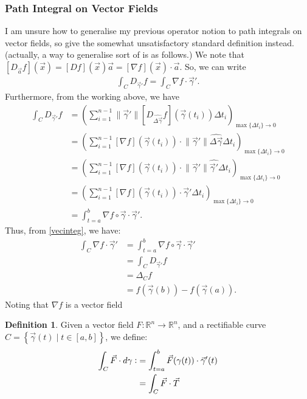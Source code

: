 \documentclass{article}
\theoremstyle{definition}
\newtheorem{defn}{Definition}[subsubsection]
\begin{document}
\subsubsection{Path Integral on Vector Fields}
I am unsure how to generalise my previous operator notion to path integrals on vector fields, so give the somewhat unsatisfactory standard definition instead.
(actually, a way to generalise sort of is as follows.)
We note that $[D_{\vec a}f](\vec x)=[Df](\vec x)\vec a=[\nabla f](\vec x)\cdot\vec a$. So, we can write
\begin{align}
	\int_CD_{\vec\gamma'}f=\int_C\nabla f\cdot\vec\gamma'.\label{vecinteg}
\end{align}
Furthermore, from the working above, we have
\begin{align*}
	\int_CD_{\vec\gamma'}f&=\left(\sum_{i=1}^{n-1}\lVert \vec\gamma'\rVert\left[D_{\hat{\Delta\vec\gamma}}f\right]\left(\vec\gamma (t_i)\right)\Delta t_i\right)_{\max\{\Delta t_i\}\rightarrow0}\\
	&=\left(\sum_{i=1}^{n-1}\left[\nabla f\right]\left(\vec\gamma (t_i)\right)\cdot\lVert \vec\gamma'\rVert\hat{\Delta\vec\gamma}\Delta t_i\right)_{\max\{\Delta t_i\}\rightarrow0}\\
	&=\left(\sum_{i=1}^{n-1}\left[\nabla f\right]\left(\vec\gamma (t_i)\right)\cdot\lVert \vec\gamma'\rVert\hat{\vec\gamma'}\Delta t_i\right)_{\max\{\Delta t_i\}\rightarrow0}\\
	&=\left(\sum_{i=1}^{n-1}\left[\nabla f\right]\left(\vec\gamma (t_i)\right)\cdot\vec\gamma'\Delta t_i\right)_{\max\{\Delta t_i\}\rightarrow0}\\
	&=\int_{t=a}^b\nabla f\circ\vec\gamma \cdot\vec\gamma'.
\end{align*}
Thus, from \eqref{vecinteg}, we have:
\begin{align*}
	\int_C\nabla f\cdot\vec\gamma'&=\int_{t=a}^b\nabla f\circ\vec\gamma \cdot\vec\gamma'\\
	&=\int_CD_{\vec\gamma'}f\\
	&=\Delta_Cf\\
	&=f(\vec\gamma(b))-f(\vec\gamma(a)).
\end{align*}
Noting that $\nabla f$ is a vector field 
\begin{defn}
	Given a vector field $F:\mathbb{R}^n\rightarrow \mathbb{R}^n$, and a rectifiable curve $C=\left\{\vec\gamma(t)\mid t\in[a,b]\right\}$, we define:
	\begin{align*}
		\int_C\vec F\cdot d\gamma\vcentcolon&=\int_{t=a}^b\vec F(\gamma(t))\cdot\vec \gamma'(t)\\
		&=\int_C\vec F\cdot\vec T
	\end{align*}
\end{defn}
\newpage
\end{document}
